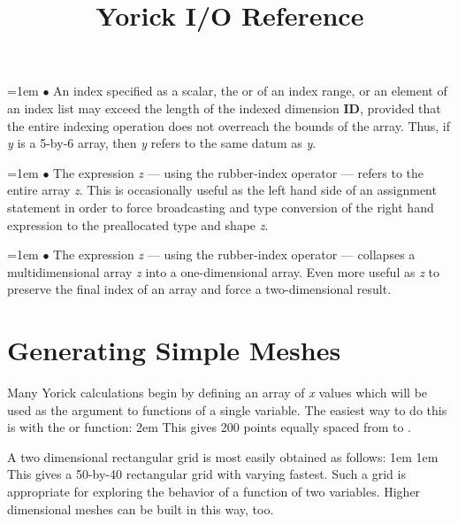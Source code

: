 \hangindent=1em
$\bullet$ An index specified as a scalar, the  or  of
an index range, or an element of an index list may exceed the length of the
indexed dimension {\bf ID}, provided that the entire indexing operation does
not overreach the bounds of the array.  Thus, if {\it y\/} is a 5-by-6 array,
then {\it y\/} refers to the same datum as  {\it y\/}.

\hangindent=1em
$\bullet$ The expression {\it z\/} --- using the rubber-index
operator  --- refers to the entire array {\it z\/}.  This is
occasionally useful as the left hand side of an assignment statement in
order to force broadcasting and type conversion of the right hand
expression to the preallocated type and shape {\it z\/}.

\hangindent=1em
$\bullet$ The expression {\it z\/}\kbd{(*)} --- using the rubber-index
operator \kbd{*} --- collapses a multidimensional array {\it z\/} into
a one-dimensional array.  Even more useful as {\it z\/}\kbd{(*,)} to
preserve the final index of an array and force a two-dimensional result.

\section{Generating Simple Meshes}

Many Yorick calculations begin by defining an array of {\it x\/} values
which will be used as the argument to functions of a single variable.
The easiest way to do this is with the  or  function:
\begindemo
\hglue2em 
\enddemo
This gives 200 points equally spaced from  to .

A two dimensional rectangular grid is most easily obtained as follows:
\begindemo
\hglue1em 
\hglue1em 
\enddemo
This gives a 50-by-40 rectangular grid with  varying fastest.
Such a grid is appropriate for exploring the behavior of a function of
two variables.  Higher dimensional meshes can be built in this way, too.

\copyrightnotice

\par\vfill\supereject


\title{Yorick I/O Reference}

